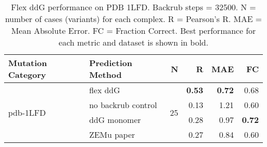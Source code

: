 \begin{table}
  \begin{tabular}{llrrrr}
\toprule
Mutation Category &   Prediction Method &   N &    R &  MAE &   FC \\
\midrule
 \multirow{ 4}{*}{pdb-1LFD} & flex ddG & \multirow{ 4}{*}{25} & \textbf{0.53} & \textbf{0.72} & 0.68  \\
 & no backrub control & & 0.13 & 1.21 & 0.60  \\
 & ddG monomer & & 0.28 & 0.97 & \textbf{0.72}  \\
 & ZEMu paper & & 0.27 & 0.84 & 0.60  \\
\bottomrule
\end{tabular}
  \caption[Flex ddG performance on PDB 1LFD]{
    Flex ddG performance on PDB 1LFD. Backrub steps = 32500. N = number of cases (variants) for each complex. R = Pearson's R. MAE = Mean Absolute Error. FC = Fraction Correct. Best performance for each metric and dataset is shown in bold.
  } \label{tab:table-pdb-1LFD}
\end{table}
